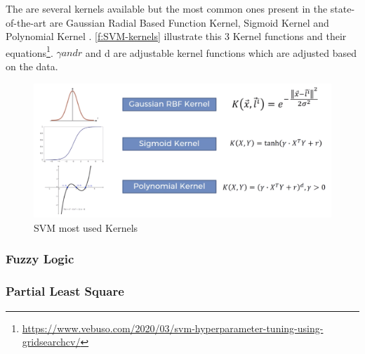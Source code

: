 The are several kernels available but the most common ones present in the state-of-the-art are Gaussian Radial Based Function Kernel, Sigmoid Kernel and Polynomial Kernel \cite{Hussain2011}. \autoref{f:SVM-kernels} illustrate this 3 Kernel functions and their equations\footnote{\url{https://www.vebuso.com/2020/03/svm-hyperparameter-tuning-using-gridsearchcv/}}.
\begin{math}\gamma and r \end{math} and d are adjustable kernel functions which are adjusted based on the data.


\begin{figure}[h]
\centering
\includegraphics[width=14cm]{figures/Ch2/Kernels.png}
\caption{SVM most used Kernels}
\label{f:SVM-kernels}
\end{figure}

\subsubsection{Fuzzy Logic}



\subsubsection{Partial Least Square}


